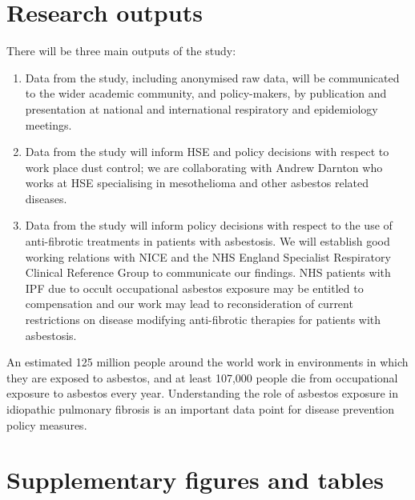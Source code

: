 \documentclass[a4paper,10pt]{article}
\begin{document}
\begin{appendices}

\section{Research outputs}

There will be three main outputs of the study:

 \begin{enumerate} 
 \item Data from the study, including anonymised raw data, will be communicated to the wider academic community,
and policy-makers, by publication and presentation at national and international respiratory and epidemiology
meetings.
 \item Data from the study will inform HSE and policy decisions with respect to work place dust control; we are
collaborating with Andrew Darnton who works at HSE specialising in mesothelioma and other asbestos related
diseases.
 \item Data from the study will inform policy decisions with respect to the use of anti-fibrotic treatments in patients
with asbestosis. We will establish good working relations with NICE
and the NHS England Specialist Respiratory Clinical Reference Group to communicate our findings.
NHS patients with IPF due to occult occupational asbestos exposure may be entitled to compensation and our
work may lead to reconsideration of current restrictions on disease modifying anti-fibrotic therapies for patients
with asbestosis.
 \end{enumerate} 

An estimated 125 million people around the world work in environments in which they are exposed to asbestos,
and at least 107,000 people die from occupational exposure to asbestos every year\cite{Concha-Barrientos20.5}. Understanding the role of
asbestos exposure in idiopathic pulmonary fibrosis is an important data point for disease prevention policy
measures.

\newpage

\section{Supplementary figures and tables}


\end{appendices}
\end{document}
